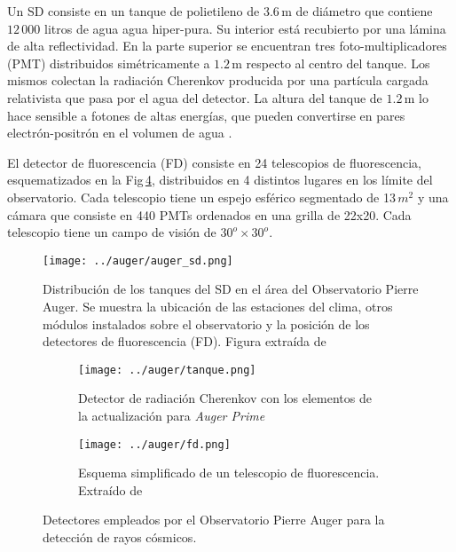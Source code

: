 Un SD consiste en un tanque de polietileno de $3.6\,$m de diámetro que contiene $12\,000$ litros de agua agua hiper-pura. Su interior está recubierto por una lámina de alta reflectividad. En la parte superior se encuentran tres foto-multiplicadores (PMT) distribuidos simétricamente  a $1.2\,$m respecto al centro del tanque. Los mismos colectan la radiación Cherenkov producida por una partícula cargada relativista que pasa por el agua del detector. La altura del tanque de $1.2\,$m lo hace sensible a fotones de altas energías, que pueden convertirse en pares electrón-positrón en el volumen de agua \cite{como_funciona_auger}.

El detector de fluorescencia (FD) consiste en 24 telescopios de fluorescencia, esquematizados en la Fig\,\ref{fig:FD}, distribuidos en 4 distintos lugares en los límite del observatorio. %
Cada telescopio tiene un espejo esférico segmentado de 13$\,m^2$ y una cámara que consiste en 440 PMTs ordenados en una grilla de 22x20. Cada telescopio tiene un campo de visión de $30^o\times30^o$.%

\begin{figure}[H]
	\centering
	\texttt{[image: ../auger/auger\_sd.png]}
	\caption{Distribución de los tanques del SD en el área del Observatorio Pierre Auger. Se muestra la ubicación de las estaciones del clima, otros módulos instalados sobre el observatorio y la posición de los detectores de fluorescencia (FD). Figura extraída de \cite{como_funciona_auger}}
	\label{fig:auger_sd}
\end{figure}

\begin{figure}[H]
    \begin{subfigure}[t]{0.45\textwidth}
	\texttt{[image: ../auger/tanque.png]}
	\caption{Detector de radiación Cherenkov con los elementos de la actualización para \emph{Auger Prime}} 	\label{fig:tanque}
    \end{subfigure}%
    \hspace{\fill}
    \begin{subfigure}[t]{0.5\textwidth}
	\texttt{[image: ../auger/fd.png]}
	\caption{Esquema simplificado de un telescopio de fluorescencia. Extraído de \cite{kit_oracle}}
	\label{fig:FD}
    \end{subfigure}%
    \caption{Detectores empleados por el Observatorio Pierre Auger para la detección de rayos cósmicos.}
	\end{figure}

